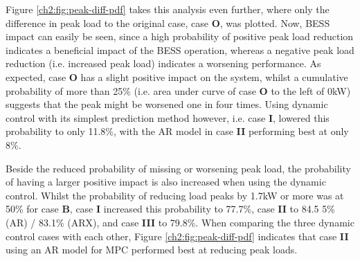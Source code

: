 

Figure \ref{ch2:fig:peak-diff-pdf} takes this analysis even further, where only the difference in peak load to the original case, case \textbf{O}, was plotted.
Now, BESS impact can easily be seen, since a high probability of positive peak load reduction indicates a beneficial impact of the BESS operation, whereas a negative peak load reduction (i.e. increased peak load) indicates a worsening performance.
As expected, case \textbf{O} has a slight positive impact on the system, whilst a cumulative probability of more than 25\% (i.e. area under curve of case \textbf{O} to the left of 0kW) suggests that the peak might be worsened one in four times.
Using dynamic control with its simplest prediction method however, i.e. case \textbf{I}, lowered this probability to only 11.8\%, with the AR model in case \textbf{II} performing best at only 8\%.

Beside the reduced probability of missing or worsening peak load, the probability of having a larger positive impact is also increased when using the dynamic control.
Whilst the probability of reducing load peaks by 1.7kW or more was at 50\% for case \textbf{B}, case \textbf{I} increased this probability to 77.7\%, case \textbf{II} to 84.5 5\% (AR) / 83.1\% (ARX), and case \textbf{III} to 79.8\%.
When comparing the three dynamic control cases with each other, Figure \ref{ch2:fig:peak-diff-pdf} indicates that case \textbf{II} using an AR model for MPC performed best at reducing peak loads.





